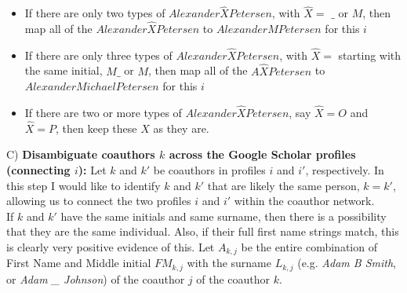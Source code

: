  \begin{itemize}
 \item If there are only two  types of $Alexander \hat X Petersen$, with $\hat X=$ $\_$ or $M$, then map all of the $Alexander \hat X Petersen$ to $Alexander M Petersen$ for this $i$
 \item If there are only three types of $Alexander \hat X Petersen$, with $\hat X=$ starting with the same initial, $M\_$ or $M$, then map all of the $A\hat X Petersen$ to $Alexander Michael Petersen$ for this $i$
 \item If there are two or more types of $Alexander \hat X Petersen$, say $\hat X=O$ and $\hat X=P$, then keep these $X$ as they are.
 
  
\end{itemize}

C)  {\bf Disambiguate coauthors $k$ across the Google Scholar profiles (connecting $i$):} Let  $k$ and $k'$ be coauthors in profiles $i$ and $i'$, respectively.   In this step I would like to identify $k$ and $k'$ that are likely the same person, $k=k'$, allowing us to connect the two profiles $i$ and $i'$ within the coauthor network.\\

 If $k$ and $k'$ have the same initials and same surname, then there is a possibility that they are the same individual. Also, if their full first name strings match, this is clearly very positive evidence of this. Let $A_{k,j}$ be the entire combination of First Name and Middle initial $FM_{k,j}$ with the surname $L_{k,j}$ (e.g. {\it Adam B Smith}, or {\it Adam \_ Johnson}) of the coauthor $j$ of the coauthor $k$. 

